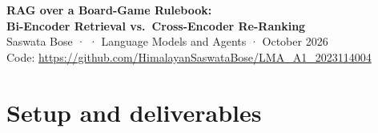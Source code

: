 \documentclass[10pt,a4paper]{article}
\begin{document}
\begin{center}
  {\LARGE\bfseries\color{heading} RAG over a Board-Game Rulebook:\\[2pt]
   Bi-Encoder Retrieval vs.\ Cross-Encoder Re-Ranking}\\[6pt]
  {\small Saswata Bose \quad· \quad·\quad
   Language Models and Agents \quad· October 2026}\\[3pt]
  {\small Code: \url{https://github.com/HimalayanSaswataBose/LMA_A1_2023114004}}
\end{center}
\vspace{-4pt}

\section*{Setup and deliverables}
\end{document}
